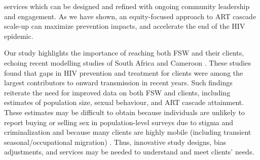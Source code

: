 services which can be designed and refined with ongoing community leadership and engagement.
As we have shown, an equity-focused approach to ART cascade scale-up
can maximize prevention impacts, and accelerate the end of the HIV epidemic.
\par
Our study highlights the importance of reaching both FSW and their clients,
echoing recent modelling studies of South Africa and Cameroon \cite{Stone2021,Silhol2024}.
These studies found that gaps in HIV prevention and treatment for clients
were among the largest contributors to onward transmission in recent years.
Such findings reiterate the need for improved data on both FSW and clients,
including estimates of population size, sexual behaviour, and ART cascade attainment.
These estimates may be difficult to obtain
because individuals are unlikely to report buying or selling sex in population-level surveys
due to stigma and criminalization \cite{Behanzin2013} and
because many clients are highly mobile
(including transient seasonal/occupational migration) \cite{Camlin2019}.
Thus, innovative study designs, bias adjustments, and services may be needed
to understand and meet clients' needs.
\par
